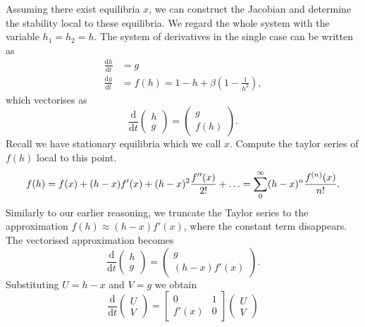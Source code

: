 \documentclass{report}
\begin{document}
Assuming there exist equilibria \(x\), 
we can construct the Jacobian and determine the stability local to these equilibria.
We regard the whole system with the variable \(h_1=h_2=h\).
The system of derivatives in the single case can be written as
\begin{equation}
    \begin{aligned}
        \frac{\mathrm{d}h}{\mathrm{d}t} &= g \\
        \frac{\mathrm{d}g}{\mathrm{d}t} &= f(h) = 1-h +\beta\left(1-\frac{1}{h^2}\right),
    \end{aligned}
\end{equation}
which vectorises as
\begin{equation}
    \frac{\mathrm{d}}{\mathrm{d}t} \begin{pmatrix}
        h \\
        g
    \end{pmatrix} = \begin{pmatrix}
        g \\
        f(h)
    \end{pmatrix}.
\end{equation}
Recall we have stationary equilibria which we call \(x\). Compute the taylor series of \(f(h)\) local to this point.
\begin{equation}
    f(h) = f(x) + (h-x)f'(x) + (h-x)^2\frac{f''(x)}{2!} + \mathellipsis =\sum_{0}^{\infty} (h-x)^n\frac{f^{(n)}(x)}{n!}.
\end{equation}
Similarly to our earlier reasoning, we truncate the Taylor series to the approximation $f(h) \approx (h-x)f'(x)$,
where the constant term disappears.
The vectorised approximation becomes
\begin{equation}
    \frac{\mathrm{d}}{\mathrm{d}t}\begin{pmatrix}
        h \\
        g
    \end{pmatrix} = \begin{pmatrix}
        g \\
        (h-x)f'(x)
    \end{pmatrix}.
\end{equation}
Substituting \(U = h-x\) and \(V = g\) we obtain
\begin{equation}
    \frac{\mathrm{d}}{\mathrm{d}t} \begin{pmatrix}
        U \\
        V
    \end{pmatrix} = \begin{bmatrix}
        0 & 1 \\
        f'(x) & 0
    \end{bmatrix} \begin{pmatrix}
        U \\
        V
    \end{pmatrix} 
\end{equation}
\end{document}
